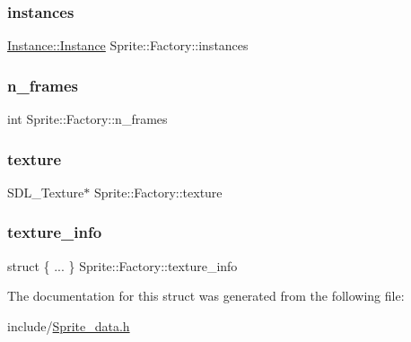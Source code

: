 \subsubsection{\texorpdfstring{instances}{instances}}
{\footnotesize\ttfamily \mbox{\hyperlink{struct_sprite_1_1_instance_1_1_instance}{Instance\+::\+Instance}} Sprite\+::\+Factory\+::instances}

\mbox{\label{struct_sprite_1_1_factory_a534d25967d63f70feefa2002c20c9e98}} 
\subsubsection{\texorpdfstring{n\+\_\+frames}{n\_frames}}
{\footnotesize\ttfamily int Sprite\+::\+Factory\+::n\+\_\+frames}

\mbox{\label{struct_sprite_1_1_factory_af7d0d4d495f2278219e5f550611672a0}} 
\subsubsection{\texorpdfstring{texture}{texture}}
{\footnotesize\ttfamily S\+D\+L\+\_\+\+Texture$\ast$ Sprite\+::\+Factory\+::texture}

\mbox{\label{struct_sprite_1_1_factory_a4459fde931b806234fcb2d0ff03b28b7}} 
\subsubsection{\texorpdfstring{texture\+\_\+info}{texture\_info}}
{\footnotesize\ttfamily struct \{ ... \}   Sprite\+::\+Factory\+::texture\+\_\+info}



The documentation for this struct was generated from the following file\+:\begin{DoxyCompactItemize}
\item 
include/\mbox{\hyperlink{_sprite__data_8h}{Sprite\+\_\+data.\+h}}\end{DoxyCompactItemize}
